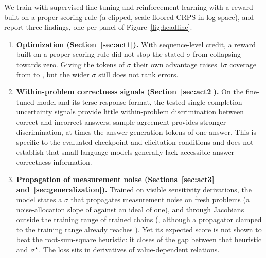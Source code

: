 We train  with supervised fine-tuning and reinforcement learning with a reward built on a proper scoring
rule (a clipped, scale-floored CRPS in log space), and report three findings, one per panel of Figure~\ref{fig:headline}.
\begin{enumerate}[leftmargin=*,itemsep=2pt]
  \item \textbf{Optimization (Section~\ref{sec:act1}).} With sequence-level credit, a reward built on a proper scoring rule did not stop
  the stated $\sigma$ from collapsing towards zero. Giving the tokens of $\sigma$ their own advantage raises $1\sigma$
  coverage from  to , but the wider $\sigma$ still does not rank errors.
  \item \textbf{Within-problem correctness signals (Section~\ref{sec:act2}).} On the fine-tuned  model
  and its terse response format, the tested single-completion uncertainty signals provide little within-problem
  discrimination between correct and incorrect answers; sample agreement provides stronger discrimination, at
   times the answer-generation tokens of one answer. This is specific to the evaluated checkpoint and elicitation
  conditions and does not establish that small language models generally lack accessible answer-correctness
  information.
  \item \textbf{Propagation of measurement noise (Sections~\ref{sec:act3} and~\ref{sec:generalization}).} Trained on
  visible sensitivity derivations, the model states a $\sigma$ that propagates measurement noise on fresh problems
  (a noise-allocation slope of  against an ideal of one), and through Jacobians outside the training
  range of trained chains (, although a propagator clamped to the training range already reaches
  ). Yet its expected score is not shown to beat the root-sum-square heuristic: it closes
   of the gap between that heuristic and $\sigma^{\star}$. The loss sits in derivatives of value-dependent
  relations.
\end{enumerate}

